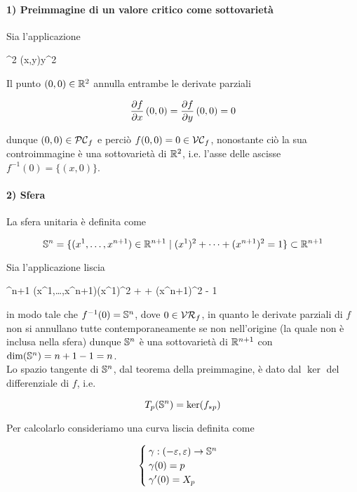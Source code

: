 \paragraph{1) Preimmagine di un valore critico come sottovarietà}

Sia l'applicazione

	{\R^{2}}{\R}
	{(x,y)}{y^{2}}

Il punto $ (0,0) \in \R^{2} $ annulla entrambe le derivate parziali

\begin{equation}
	\pdv{f}{x} \, (0,0) = \pdv{f}{y} \, (0,0) = 0
\end{equation}

dunque $ (0,0) \in \PC_{f} $ e perciò $ f(0,0) = 0 \in \VC_{f} $, nonostante ciò la sua controimmagine è una sottovarietà di $ \R^{2} $, i.e. l'asse delle ascisse $ f^{-1}(0) = \{(x,0)\} $.

\paragraph{2) Sfera}

La sfera unitaria è definita come

\begin{equation}
	\S^{n} = \{ (x^{1},\dots,x^{n+1}) \in \R^{n+1} \mid (x^{1})^{2} + \cdots + (x^{n+1})^{2} = 1 \} \subset \R^{n+1}
\end{equation}

Sia l'applicazione liscia

	{\R^{n+1}}{\R}
	{(x^{1},\dots,x^{n+1})}{(x^{1})^{2} + \cdots + (x^{n+1})^{2} - 1}

in modo tale che $ f^{-1}(0) = \S^{n} $, dove $ 0 \in \VR_{f} $, in quanto le derivate parziali di $ f $ non si annullano tutte contemporaneamente se non nell'origine (la quale non è inclusa nella sfera) dunque $ \S^{n} $ è una sottovarietà di $ \R^{n+1} $ con $ \dim(\S^{n}) = n+1-1 = n $.\\
Lo spazio tangente di $ \S^{n} $, dal teorema della preimmagine, è dato dal $ \ker $ del differenziale di $ f $, i.e. 

\begin{equation}
	T_{p}(\S^{n}) = \ker(f_{*p})
\end{equation}

Per calcolarlo consideriamo una curva liscia definita come

\begin{equation}
	\begin{cases}
		\gamma : (-\varepsilon,\varepsilon) \to \S^{n}\\
		\gamma(0) = p\\
		\gamma'(0) = X_{p}
	\end{cases}
\end{equation}

